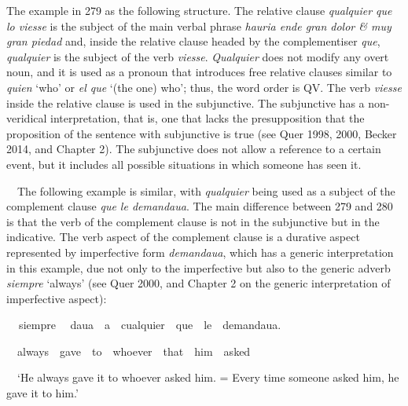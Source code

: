 \begin{styleStandard}
The example in 279 as the following structure. The relative clause \textit{qualquier que} \textit{lo viesse }is the subject of the main verbal phrase \textit{hauria ende gran dolor \& muy gran piedad} and, inside the relative clause headed by the complementiser \textit{que}, \textit{qualquier} is the subject of the verb \textit{viesse}. \textit{Qualquier} does not modify any overt noun, and it is used as a pronoun that introduces free relative clauses similar to \textit{quien} ‘who’ or \textit{el que} ‘(the one) who’; thus, the word order is QV. The verb \textit{viesse} inside the relative clause is used in the subjunctive. The subjunctive has a non-veridical interpretation, that is, one that lacks the presupposition that the proposition of the sentence with subjunctive is true (see Quer 1998, 2000, Becker 2014, and Chapter 2). The subjunctive does not allow a reference to a certain event, but it includes all possible situations in which someone has seen it.
\end{styleStandard}

\begin{styleStandard}
\ \ The following example is similar, with \textit{qualquier} being used as a subject of the complement clause \textit{que le demandaua}. The main difference between 279 and 280 is that the verb of the complement clause is not in the subjunctive but in the indicative. The verb aspect of the complement clause is a durative aspect represented by imperfective form \textit{demandaua}, which has a generic interpretation in this example, due not only to the imperfective but also to the generic adverb \textit{siempre} ‘always’ (see Quer 2000, and Chapter 2 on the generic interpretation of imperfective aspect):
\end{styleStandard}

\begin{styleStandard}
\textbf{\ \ }siempre \ \ daua\ \ a\ \ cualquier\ \ que\ \ le\ \ demandaua.
\end{styleStandard}

\begin{styleStandard}
\ \ always\ \ gave\ \ to\ \ whoever\ \ that\ \ him\ \ asked
\end{styleStandard}

\begin{styleStandard}
\ \ ‘He always gave it to whoever asked him. = Every time someone asked him, he gave it to him.’
\end{styleStandard}

